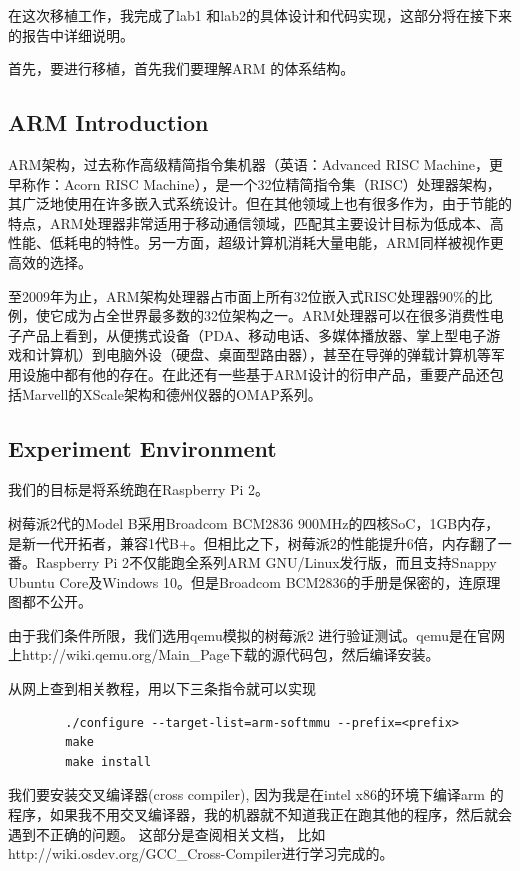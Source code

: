 \documentclass[11pt,a4paper]{article}
\begin{document}
\begin{CJK}{UTF8}{gkai}
	在这次移植工作，我完成了lab1 和lab2的具体设计和代码实现，这部分将在接下来的报告中详细说明。
	
	首先，要进行移植，首先我们要理解ARM 的体系结构。
	
	\subsection{ARM Introduction}
	ARM架构，过去称作高级精简指令集机器（英语：Advanced RISC Machine，更早称作：Acorn RISC Machine），是一个32位精简指令集（RISC）处理器架构，其广泛地使用在许多嵌入式系统设计。但在其他领域上也有很多作为，由于节能的特点，ARM处理器非常适用于移动通信领域，匹配其主要设计目标为低成本、高性能、低耗电的特性。另一方面，超级计算机消耗大量电能，ARM同样被视作更高效的选择。
	
	至2009年为止，ARM架构处理器占市面上所有32位嵌入式RISC处理器90\%的比例，使它成为占全世界最多数的32位架构之一。ARM处理器可以在很多消费性电子产品上看到，从便携式设备（PDA、移动电话、多媒体播放器、掌上型电子游戏和计算机）到电脑外设（硬盘、桌面型路由器），甚至在导弹的弹载计算机等军用设施中都有他的存在。在此还有一些基于ARM设计的衍申产品，重要产品还包括Marvell的XScale架构和德州仪器的OMAP系列。
	

	\subsection{Experiment Environment}
	我们的目标是将系统跑在Raspberry Pi 2。
	
	树莓派2代的Model B采用Broadcom BCM2836 900MHz的四核SoC，1GB内存，是新一代开拓者，兼容1代B+。但相比之下，树莓派2的性能提升6倍，内存翻了一番。Raspberry Pi 2不仅能跑全系列ARM GNU/Linux发行版，而且支持Snappy Ubuntu Core及Windows 10。但是Broadcom BCM2836的手册是保密的，连原理图都不公开。
	
	由于我们条件所限，我们选用qemu模拟的树莓派2 进行验证测试。qemu是在官网上http://wiki.qemu.org/Main\_Page下载的源代码包，然后编译安装。
	
	从网上查到相关教程，用以下三条指令就可以实现
	
		\begin{lstlisting}
		./configure --target-list=arm-softmmu --prefix=<prefix>
		make 
		make install
		\end{lstlisting}
	
	我们要安装交叉编译器(cross compiler), 因为我是在intel x86的环境下编译arm 的程序，如果我不用交叉编译器，我的机器就不知道我正在跑其他的程序，然后就会遇到不正确的问题。
	这部分是查阅相关文档， 比如 http://wiki.osdev.org/GCC\_Cross-Compiler进行学习完成的。
	

\end{CJK}
\end{document}
